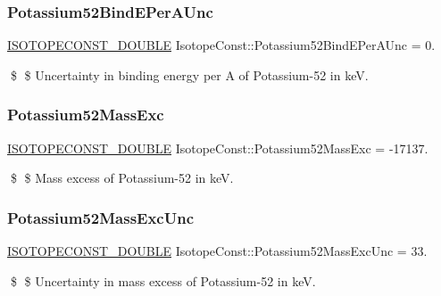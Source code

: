 \subsubsection{\texorpdfstring{Potassium52\+Bind\+E\+Per\+A\+Unc}{Potassium52BindEPerAUnc}}
{\footnotesize\ttfamily \mbox{\hyperlink{group___isotope_const-_macros_ga8f45a7272ce02c0b4c65c44636ed719a}{I\+S\+O\+T\+O\+P\+E\+C\+O\+N\+S\+T\+\_\+\+D\+O\+U\+B\+LE}} Isotope\+Const\+::\+Potassium52\+Bind\+E\+Per\+A\+Unc = 0.}

\$ \$ Uncertainty in binding energy per A of Potassium-\/52 in keV. \mbox{\label{group___isotope_const-_potassium-_k52_ga31b52be1c47f7419cbedcc2a6693085e}} 
\subsubsection{\texorpdfstring{Potassium52\+Mass\+Exc}{Potassium52MassExc}}
{\footnotesize\ttfamily \mbox{\hyperlink{group___isotope_const-_macros_ga8f45a7272ce02c0b4c65c44636ed719a}{I\+S\+O\+T\+O\+P\+E\+C\+O\+N\+S\+T\+\_\+\+D\+O\+U\+B\+LE}} Isotope\+Const\+::\+Potassium52\+Mass\+Exc = -\/17137.}

\$ \$ Mass excess of Potassium-\/52 in keV. \mbox{\label{group___isotope_const-_potassium-_k52_ga35475713a01fe597f17e3cde86dbef17}} 
\subsubsection{\texorpdfstring{Potassium52\+Mass\+Exc\+Unc}{Potassium52MassExcUnc}}
{\footnotesize\ttfamily \mbox{\hyperlink{group___isotope_const-_macros_ga8f45a7272ce02c0b4c65c44636ed719a}{I\+S\+O\+T\+O\+P\+E\+C\+O\+N\+S\+T\+\_\+\+D\+O\+U\+B\+LE}} Isotope\+Const\+::\+Potassium52\+Mass\+Exc\+Unc = 33.}

\$ \$ Uncertainty in mass excess of Potassium-\/52 in keV. \mbox{\label{group___isotope_const-_potassium-_k52_ga3c8243329d74da322ab53102eaa51484}} 
